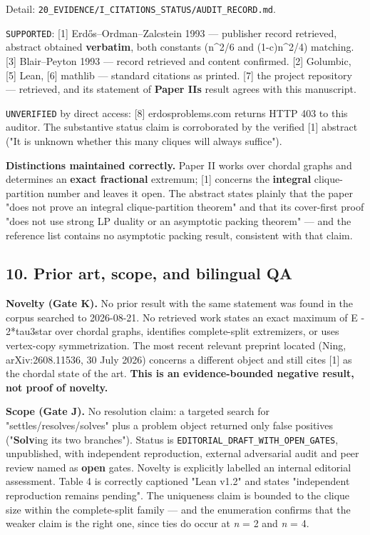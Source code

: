 \documentclass[
  9pt,
  a4paper,
]{article}
\begin{document}
Detail: \texttt{20\_EVIDENCE/I\_CITATIONS\_STATUS/AUDIT\_RECORD.md}.

\texttt{SUPPORTED}: {[}1{]} Erdős--Ordman--Zalcstein 1993 --- publisher
record retrieved, abstract obtained \textbf{verbatim}, both constants
(n\^{}2/6 and (1-c)n\^{}2/4) matching. {[}3{]} Blair--Peyton 1993 ---
record retrieved and content confirmed. {[}2{]} Golumbic, {[}5{]} Lean,
{[}6{]} mathlib --- standard citations as printed. {[}7{]} the project
repository --- retrieved, and its statement of \textbf{Paper
II\textquotesingle s} result agrees with this manuscript.

\texttt{UNVERIFIED} by direct access: {[}8{]} erdosproblems.com returns
HTTP 403 to this auditor. The substantive status claim is corroborated
by the verified {[}1{]} abstract ("It is unknown whether this many
cliques will always suffice").

\textbf{Distinctions maintained correctly.} Paper II works over chordal
graphs and determines an \textbf{exact fractional} extremum; {[}1{]}
concerns the \textbf{integral} clique-partition number and leaves it
open. The abstract states plainly that the paper "does not prove an
integral clique-partition theorem" and that its cover-first proof "does
not use strong LP duality or an asymptotic packing theorem" --- and the
reference list contains no asymptotic packing result, consistent with
that claim.

\subsection{10. Prior art, scope, and bilingual
QA}\label{10-prior-art-scope-and-bilingual-qa}

\textbf{Novelty (Gate K).} No prior result with the same statement was
found in the corpus searched to 2026-08-21. No retrieved work states an
exact maximum of \textbar E\textbar{} - 2*tau3star over chordal graphs,
identifies complete-split extremizers, or uses vertex-copy
symmetrization. The most recent relevant preprint located (Ning,
arXiv:2608.11536, 30 July 2026) concerns a different object and still
cites {[}1{]} as the chordal state of the art. \textbf{This is an
evidence-bounded negative result, not proof of novelty.}

\textbf{Scope (Gate J).} No resolution claim: a targeted search for
"settles/resolves/solves" plus a problem object returned only false
positives ("\textbf{Solv}ing its two branches"). Status is
\texttt{EDITORIAL\_DRAFT\_WITH\_OPEN\_GATES}, unpublished, with
independent reproduction, external adversarial audit and peer review
named as \textbf{open} gates. Novelty is explicitly labelled an internal
editorial assessment. Table 4 is correctly captioned "Lean v1.2" and
states "independent reproduction remains pending". The uniqueness claim
is bounded to the clique size within the complete-split family --- and
the enumeration confirms that the weaker claim is the right one, since
ties do occur at \emph{n} = 2 and \emph{n} = 4.
\end{document}
